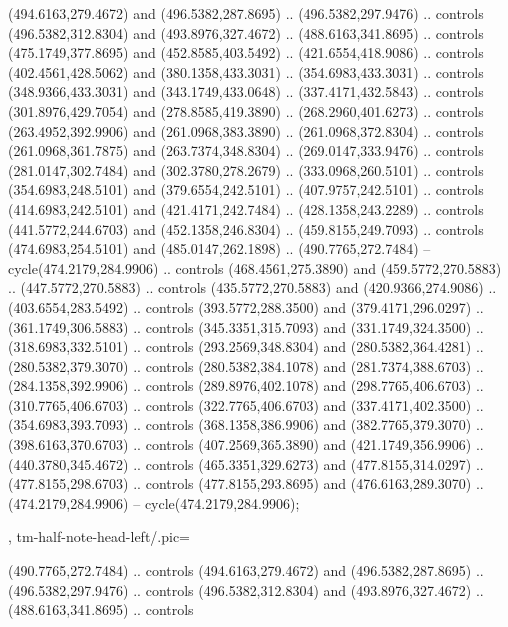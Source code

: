 {{\begin{scope}[y=-0.80pt,x=0.80pt,scale=0.038,yshift=270pt,xshift=-124pt]
        (494.6163,279.4672) and (496.5382,287.8695) .. (496.5382,297.9476) .. controls
        (496.5382,312.8304) and (493.8976,327.4672) .. (488.6163,341.8695) .. controls
        (475.1749,377.8695) and (452.8585,403.5492) .. (421.6554,418.9086) .. controls
        (402.4561,428.5062) and (380.1358,433.3031) .. (354.6983,433.3031) .. controls
        (348.9366,433.3031) and (343.1749,433.0648) .. (337.4171,432.5843) .. controls
        (301.8976,429.7054) and (278.8585,419.3890) .. (268.2960,401.6273) .. controls
        (263.4952,392.9906) and (261.0968,383.3890) .. (261.0968,372.8304) .. controls
        (261.0968,361.7875) and (263.7374,348.8304) .. (269.0147,333.9476) .. controls
        (281.0147,302.7484) and (302.3780,278.2679) .. (333.0968,260.5101) .. controls
        (354.6983,248.5101) and (379.6554,242.5101) .. (407.9757,242.5101) .. controls
        (414.6983,242.5101) and (421.4171,242.7484) .. (428.1358,243.2289) .. controls
        (441.5772,244.6703) and (452.1358,246.8304) .. (459.8155,249.7093) .. controls
        (474.6983,254.5101) and (485.0147,262.1898) .. (490.7765,272.7484) --
        cycle(474.2179,284.9906) .. controls (468.4561,275.3890) and
        (459.5772,270.5883) .. (447.5772,270.5883) .. controls (435.5772,270.5883) and
        (420.9366,274.9086) .. (403.6554,283.5492) .. controls (393.5772,288.3500) and
        (379.4171,296.0297) .. (361.1749,306.5883) .. controls (345.3351,315.7093) and
        (331.1749,324.3500) .. (318.6983,332.5101) .. controls (293.2569,348.8304) and
        (280.5382,364.4281) .. (280.5382,379.3070) .. controls (280.5382,384.1078) and
        (281.7374,388.6703) .. (284.1358,392.9906) .. controls (289.8976,402.1078) and
        (298.7765,406.6703) .. (310.7765,406.6703) .. controls (322.7765,406.6703) and
        (337.4171,402.3500) .. (354.6983,393.7093) .. controls (368.1358,386.9906) and
        (382.7765,379.3070) .. (398.6163,370.6703) .. controls (407.2569,365.3890) and
        (421.1749,356.9906) .. (440.3780,345.4672) .. controls (465.3351,329.6273) and
        (477.8155,314.0297) .. (477.8155,298.6703) .. controls (477.8155,293.8695) and
        (476.6163,289.3070) .. (474.2179,284.9906) -- cycle(474.2179,284.9906);
    \end{scope}
  },
  tm-half-note-head-left/.pic={
    \begin{scope}[y=-0.80pt,x=0.80pt,scale=0.038,yshift=270pt,xshift=-482pt]
       (490.7765,272.7484) .. controls
        (494.6163,279.4672) and (496.5382,287.8695) .. (496.5382,297.9476) .. controls
        (496.5382,312.8304) and (493.8976,327.4672) .. (488.6163,341.8695) .. controls

\end{scope}}}
